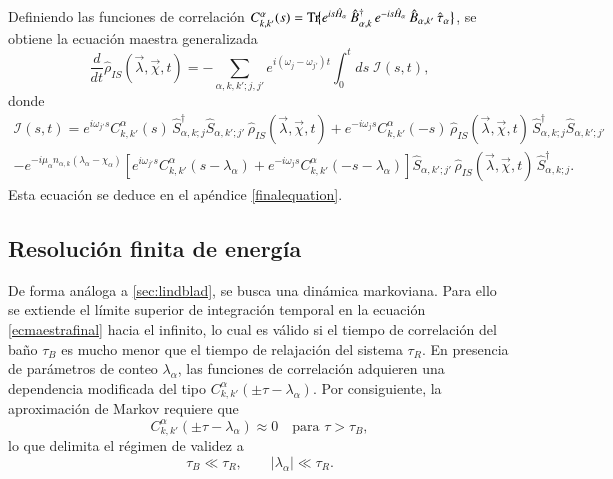 Definiendo las funciones de correlación 
\(C^{\alpha}_{k,k'}(s)=\textnormal{Tr}\!\big\{e^{is\hat{H}_{\alpha}}\,\hat{B}^{\dagger}_{\alpha,k}\,e^{-is\hat{H}_{\alpha}}\,\hat{B}_{\alpha,k'}\,\hat{\tau}_{\alpha}\big\}\),
se obtiene la ecuación maestra generalizada
\begin{equation}
    \frac{d}{dt}\hat{\rho}_{IS}(\vec{\lambda},\vec{\chi},t)
    = - \sum_{\alpha,k,k';j,j'} e^{i(\omega_{j}-\omega_{j'})t}
      \int_{0}^{t}\!ds\; \mathcal{I}(s,t),
    \label{ecmaestrafinal}
\end{equation}
donde
\begin{multline}
    \mathcal{I}(s,t) 
    = e^{i\omega_{j'}s} C^{\alpha}_{k,k'}(s)\,
      \hat{S}^{\dagger}_{\alpha,k;j}\hat{S}_{\alpha,k';j'}\,
      \hat{\rho}_{IS}(\vec{\lambda},\vec{\chi},t)
      + e^{-i\omega_{j}s} C^{\alpha}_{k,k'}(-s)\,
        \hat{\rho}_{IS}(\vec{\lambda},\vec{\chi},t)\,
        \hat{S}^{\dagger}_{\alpha,k;j}\hat{S}_{\alpha,k';j'} \\
    - e^{-i\mu_{\alpha}n_{\alpha,k}(\lambda_{\alpha}-\chi_{\alpha})}
      \!\left[
        e^{i\omega_{j'}s} C^{\alpha}_{k,k'}(s-\lambda_{\alpha})
      + e^{-i\omega_{j}s} C^{\alpha}_{k,k'}(-s-\lambda_{\alpha})
      \right]
      \hat{S}_{\alpha,k';j'}\,
      \hat{\rho}_{IS}(\vec{\lambda},\vec{\chi},t)\,
      \hat{S}^{\dagger}_{\alpha,k;j}.
    \label{ecmaestrafinalI}
\end{multline}
Esta ecuación se deduce en el apéndice \ref{finalequation}.
\label{sec2:master}

\subsection{Resolución finita de energía}

De forma análoga a \ref{sec:lindblad}, se busca una dinámica markoviana. Para ello se extiende el límite superior de integración temporal en la ecuación \eqref{ecmaestrafinal} hacia el infinito, lo cual es válido si el tiempo de correlación del baño \(\tau_{B}\) es mucho menor que el tiempo de relajación del sistema \(\tau_{R}\). En presencia de parámetros de conteo \(\lambda_{\alpha}\), las funciones de correlación adquieren una dependencia modificada del tipo \(C^{\alpha}_{k,k'}(\pm \tau-\lambda_{\alpha})\). Por consiguiente, la aproximación de Markov requiere que
\[
    C^{\alpha}_{k,k'}(\pm \tau-\lambda_{\alpha}) \approx 0 
    \quad \text{para } \tau>\tau_{B},
\]
lo que delimita el régimen de validez a
\[
    \tau_{B}\ll \tau_{R},
    \qquad 
    |\lambda_{\alpha}|\ll \tau_{R}.
\]

